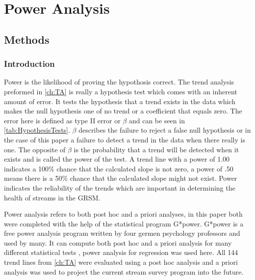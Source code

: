 \chapter{Power Analysis} \label{ch:poweranslysis}

\section{Methods}

\subsection{Introduction}

Power is the likelihood of proving the hypothosis correct.
The trend analysis  preformed in \autoref{ch:TA} is really a hypothesis test which comes with an inherent amount of error.  
It tests the hypothesis that a trend exists in the data which makes the null hypothesis one of no trend or a coefficient that equals zero.
The error here is defined as type II error or $\beta$ and can be seen in \autoref{tab:HypothesisTests}.
$\beta$ describes the failure to reject a false null hypothesis or in the case of this paper a failure to detect a trend in the data when there really is one.
The opposite of $\beta$ is the probability that a trend will be detected when it exists and is called the power of the test.
A trend line with a power of 1.00 indicates a 100$\%$ chance that the calculated slope is not zero, a power of .50 means there is a 50$\%$ chance that the calculated slope might not exist.
Power indicates the reliability of the trends which are important in determining the health of streams in the GRSM.



Power analysis refers to both  post hoc and a priori analyses, in this paper both were completed with the help of the statistical program G*power.
G*power is a free power analysis program written by four germen psychology professors and used by many.
It can compute both post hoc and a priori analysis for many different statistical tests \citep{faul2009statistical}, power analysis for regression was used here.
All 144 trend lines from \autoref{ch:TA} were evaluated using a post hoc analysis and a priori analysis was used to project the current stream survey program into the future.

